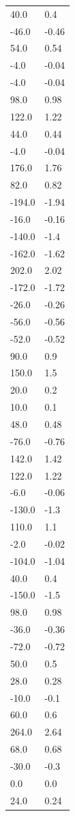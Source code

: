 \begin{longtable}{ll}
40.0 & 0.4 \\
-46.0 & -0.46 \\
54.0 & 0.54 \\
-4.0 & -0.04 \\
-4.0 & -0.04 \\
98.0 & 0.98 \\
122.0 & 1.22 \\
44.0 & 0.44 \\
-4.0 & -0.04 \\
176.0 & 1.76 \\
82.0 & 0.82 \\
-194.0 & -1.94 \\
-16.0 & -0.16 \\
-140.0 & -1.4 \\
-162.0 & -1.62 \\
202.0 & 2.02 \\
-172.0 & -1.72 \\
-26.0 & -0.26 \\
-56.0 & -0.56 \\
-52.0 & -0.52 \\
90.0 & 0.9 \\
150.0 & 1.5 \\
20.0 & 0.2 \\
10.0 & 0.1 \\
48.0 & 0.48 \\
-76.0 & -0.76 \\
142.0 & 1.42 \\
122.0 & 1.22 \\
-6.0 & -0.06 \\
-130.0 & -1.3 \\
110.0 & 1.1 \\
-2.0 & -0.02 \\
-104.0 & -1.04 \\
40.0 & 0.4 \\
-150.0 & -1.5 \\
98.0 & 0.98 \\
-36.0 & -0.36 \\
-72.0 & -0.72 \\
50.0 & 0.5 \\
28.0 & 0.28 \\
-10.0 & -0.1 \\
60.0 & 0.6 \\
264.0 & 2.64 \\
68.0 & 0.68 \\
-30.0 & -0.3 \\
0.0 & 0.0 \\
24.0 & 0.24 \\

\end{longtable}
